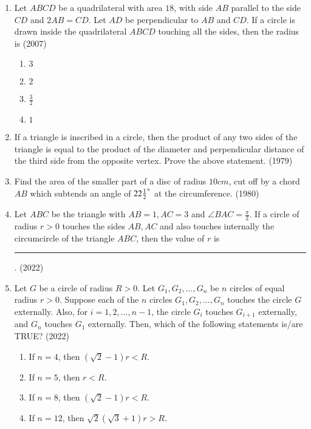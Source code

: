 \begin{enumerate}[label=\thesubsection.\arabic*,ref=\thesubsection.\theenumi]
\begin{multicols}{4}
    \end{multicols}
%
\item Let $ABCD$ be a quadrilateral with area $18$, with side $AB$ parallel to the side $CD$ and $2AB = CD$. Let $AD$ be perpendicular to $AB$ and $CD$. If a circle is drawn inside the quadrilateral $ABCD$ touching all the sides, then the radius is
\hfill (2007)
		\begin{multicols}{4}
\begin{enumerate}
\item $3$
\item $2$
\item $\frac{3}{2}$
\item $1$
\end{enumerate}
\end{multicols}
%
     	\item If a triangle is inscribed in a circle, then the product of any two sides of the triangle is equal to the product of the diameter and perpendicular distance of the third side from the opposite vertex. Prove the above statement.
     \hfill {(1979)}
     	\item Find the area of the smaller part of a disc of radius $10 cm$, cut off by a chord $AB$ which subtends an angle of $22\frac{1}{2} \degree$ at the circumference.
     \hfill {(1980)}
 \item Let $ABC$ be the triangle with $AB = 1, AC = 3$ and $\angle BAC=\frac{\pi}{2}$. If a circle of radius $r > 0$ touches the sides $AB, AC$ and also touches internally the circumcircle of the triangle $ABC$, then the value of $r$ is\rule{1cm}{0.1pt}.
	\hfill (2022)
\item Let $G$ be a circle of radius $R > 0$. Let $G_1, G_2, \dots, G_n$ be $n$ circles of equal radius $r > 0$. Suppose each of the $n$ circles $G_1, G_2, \dots, G_n$ touches the circle $G$ externally. Also, for $i = 1, 2, \dots, n - 1$, the circle $G_i$ touches $G_{i+1}$ externally, and $G_n$ touches $G_1$ externally. Then, which of the following statements is/are TRUE?
\hfill (2022)     
\begin{multicols}{2}     \begin{enumerate}
         \item If $n = 4$, then $(\sqrt{2} - 1)r < R$.
         \item If $n = 5$, then $r < R$.
         \item If $n = 8$, then $(\sqrt{2} - 1) r < R$.
         \item If $n = 12$, then $\sqrt{2} (\sqrt{3} + 1) r > R$.
    \end{enumerate} \end{multicols}

\end{enumerate}
